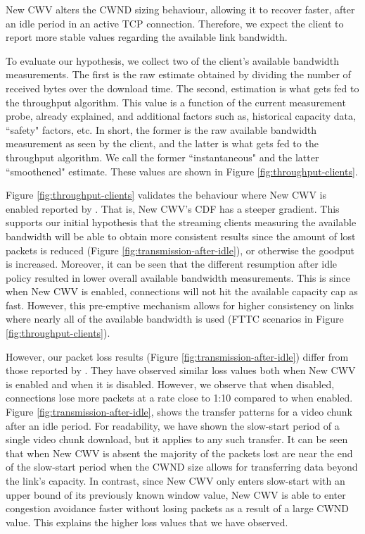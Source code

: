 \documentclass[10pt,sigconf,anonymous]{acmart}
\begin{document}
New CWV alters the CWND sizing behaviour, allowing it to recover faster, after an idle period in an active TCP connection. Therefore, we expect the client to report more stable values regarding the available link bandwidth. 

To evaluate our hypothesis, we collect two of the client's available bandwidth measurements. The first is the raw estimate obtained by dividing the number of received bytes over the download time. The second, estimation is what gets fed to the throughput algorithm. This value is a function of the current measurement probe, already explained, and additional factors such as, historical capacity data, ``safety" factors, etc. In short, the former is the raw available bandwidth measurement as seen by the client, and the latter is what gets fed to the throughput algorithm. We call the former ``instantaneous" and the latter ``smoothened" estimate. These values are shown in Figure \ref{fig:throughput-clients}.

Figure \ref{fig:throughput-clients} validates the behaviour where New CWV is enabled reported by \cite{Nazir-2014-performance-evaluation-congestion-window-validation-dash-newcwv}. That is, New CWV's CDF has a steeper gradient. This supports our initial hypothesis that the streaming clients measuring the available bandwidth will be able to obtain more consistent results since the amount of lost packets is reduced (Figure \ref{fig:transmission-after-idle}), or otherwise the goodput is increased. Moreover, it can be seen that the different resumption after idle policy resulted in lower overall available bandwidth measurements. This is since when New CWV is enabled, connections will not hit the available capacity cap as fast. However, this pre-emptive mechanism allows for higher consistency on links where nearly all of the available bandwidth is used (FTTC scenarios in Figure \ref{fig:throughput-clients}).

However, our packet loss results (Figure \ref{fig:transmission-after-idle}) differ from those reported by \cite{Nazir-2014-performance-evaluation-congestion-window-validation-dash-newcwv}. They have observed similar loss values both when New CWV is enabled and when it is disabled. However, we observe that when disabled, connections lose more packets at a rate close to 1:10 compared to when enabled. Figure \ref{fig:transmission-after-idle}, shows the transfer patterns for a video chunk after an idle period. For readability, we have shown the slow-start period of a single video chunk download, but it applies to any such transfer. It can be seen that when New CWV is absent the majority of the packets lost are near the end of the slow-start period when the CWND size allows for transferring data beyond the link's capacity. In contrast, since New CWV only enters slow-start with an upper bound of its previously known window value, New CWV is able to enter congestion avoidance faster without losing packets as a result of a large CWND value. This explains the higher loss values that we have observed.
\end{document}
